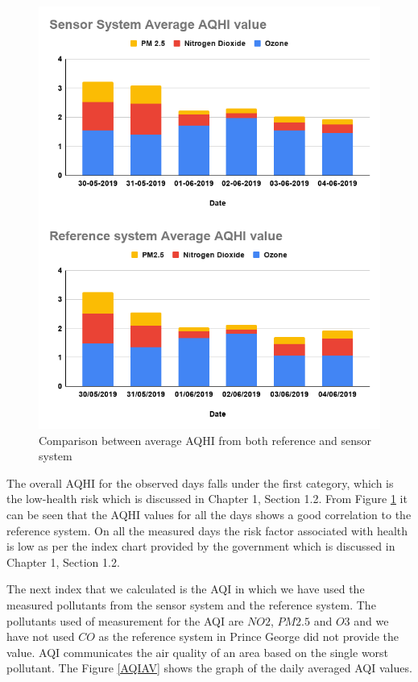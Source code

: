 \begin{figure}[h]
  \begin{center}
  \includegraphics[scale=0.52]{images/figure108.png}
  \end{center}
  \caption{Comparison between average AQHI from both reference and sensor system}
  \label{AQHIAV}
  \hspace{1 cm}
\end{figure}


The overall AQHI for the observed days falls under the first category, which is the low-health risk which is discussed in Chapter 1, Section 1.2. From Figure \ref{AQHIAV} it can be seen that the AQHI values for all the days shows a good correlation to the reference system. On all the measured days the risk factor associated with health is low as per the index chart provided by the government \cite{AQHICAN} which is discussed in Chapter 1, Section 1.2.

 The next index that we calculated is the AQI in which we have used the measured pollutants from the sensor system and the reference system. The pollutants used of measurement for the AQI are $NO2$, $PM2.5$ and $O3$ and we have not used $CO$ as the reference system in Prince George did not provide the value. AQI communicates the air quality of an area based on the single worst pollutant. The Figure \ref{AQIAV} shows the graph of the daily averaged AQI values.

